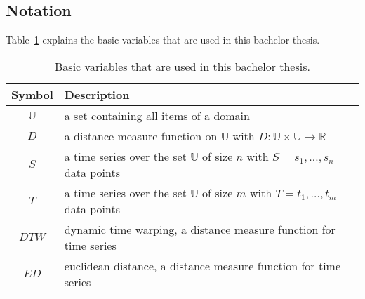 \subsection{Notation}
Table~\ref{tab:notation} explains the basic variables that are used in this bachelor thesis.

\begin{table}
    \begin{center}
        \begin{tabularx}{\textwidth}{c X}
            \textbf{Symbol} & \textbf{Description}\\
            \hline
            $\mathbb{U}$ & a set containing all items of a domain\\
            $D$ & a distance measure function on $\mathbb{U}$ with $D: \mathbb{U} \times \mathbb{U} \to \mathbb{R}$\\
            $S$ & a time series over the set $\mathbb{U}$ of size $n$ with $S = s_1, \dots, s_n$ data points\\
            $T$ & a time series over the set $\mathbb{U}$ of size $m$ with $T = t_1, \dots, t_m$ data points\\
            $DTW$ & dynamic time warping, a distance measure function for time series\\
            $ED$ & euclidean distance, a distance measure function for time series
        \end{tabularx}
    \end{center}
    \caption{Basic variables that are used in this bachelor thesis.}
	\label{tab:notation}
\end{table}
